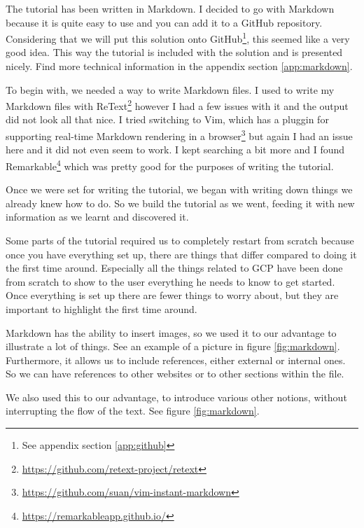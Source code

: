 
The tutorial has been written in Markdown. I decided to go with
Markdown because it is quite easy to use and you can add it to a
GitHub repository.  Considering that we will put this solution onto
GitHub\footnote{See appendix section \ref{app:github}}, this seemed
like a very good idea. This way the tutorial is included with the
solution and is presented nicely. Find more technical information in
the appendix section \ref{app:markdown}.

To begin with, we needed a way to write Markdown files. I used to
write my Markdown files with
ReText\footnote{\url{https://github.com/retext-project/retext}}
however I had a few issues with it and the output did not look all
that nice. I tried switching to Vim, which has a pluggin for
supporting real-time Markdown rendering in a
browser\footnote{\url{https://github.com/suan/vim-instant-markdown}}
but again I had an issue here and it did not even seem to work. I kept
searching a bit more and I found
Remarkable\footnote{\url{https://remarkableapp.github.io/}} which was
pretty good for the purposes of writing the tutorial.

Once we were set for writing the tutorial, we began with writing down
things we already knew how to do. So we build the tutorial as we went,
feeding it with new information as we learnt and discovered it.

Some parts of the tutorial required us to completely restart from
scratch because once you have everything set up, there are things that
differ compared to doing it the first time around. Especially all the
things related to GCP have been done from scratch to show to the user
everything he needs to know to get started. Once everything is set up
there are fewer things to worry about, but they are important to
highlight the first time around.

Markdown has the ability to insert images, so we used it to our
advantage to illustrate a lot of things. See an example of a picture
in figure \ref{fig:markdown}. Furthermore, it allows us to include
references, either external or internal ones. So we can have
references to other websites or to other sections within the file.

We also used this to our advantage, to introduce various other
notions, without interrupting the flow of the text. See figure
\ref{fig:markdown}.

